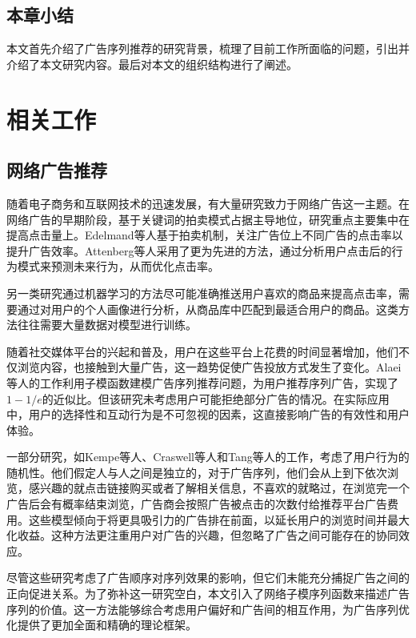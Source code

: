 \section{本章小结}
本文首先介绍了广告序列推荐的研究背景，梳理了目前工作所面临的问题，引出并介绍了本文研究内容。最后对本文的组织结构进行了阐述。


\chapter{相关工作}

\section{网络广告推荐}
\label{sec:2_1}

随着电子商务和互联网技术的迅速发展，有大量研究致力于网络广告这一主题。在网络广告的早期阶段，基于关键词的拍卖模式占据主导地位，研究重点主要集中在提高点击量上。Edelmand等人\cite{edelman2007internet}基于拍卖机制，关注广告位上不同广告的点击率以提升广告效率。Attenberg等人\cite{attenberg2009modeling}采用了更为先进的方法，通过分析用户点击后的行为模式来预测未来行为，从而优化点击率。

另一类研究通过机器学习的方法尽可能准确推送用户喜欢的商品来提高点击率\cite{Cai2021,li2021effective}，需要通过对用户的个人画像进行分析，从商品库中匹配到最适合用户的商品。这类方法往往需要大量数据对模型进行训练。

随着社交媒体平台的兴起和普及，用户在这些平台上花费的时间显著增加，他们不仅浏览内容，也接触到大量广告，这一趋势促使广告投放方式发生了变化。Alaei等人\cite{alaei2021maximizing}的工作利用子模函数建模广告序列推荐问题，为用户推荐序列广告，实现了$1-1/e$的近似比。但该研究未考虑用户可能拒绝部分广告的情况。在实际应用中，用户的选择性和互动行为是不可忽视的因素，这直接影响广告的有效性和用户体验。

一部分研究，如Kempe等人\cite{kempe2008cascade}、Craswell等人\cite{craswell2008experimental}和Tang等人\cite{tang2017robust}的工作，考虑了用户行为的随机性。他们假定人与人之间是独立的，对于广告序列，他们会从上到下依次浏览，感兴趣的就点击链接购买或者了解相关信息，不喜欢的就略过，在浏览完一个广告后会有概率结束浏览，广告商会按照广告被点击的次数付给推荐平台广告费用。这些模型倾向于将更具吸引力的广告排在前面，以延长用户的浏览时间并最大化收益。这种方法更注重用户对广告的兴趣，但忽略了广告之间可能存在的协同效应。

尽管这些研究考虑了广告顺序对序列效果的影响，但它们未能充分捕捉广告之间的正向促进关系。为了弥补这一研究空白，本文引入了网络子模序列函数来描述广告序列的价值。这一方法能够综合考虑用户偏好和广告间的相互作用，为广告序列优化提供了更加全面和精确的理论框架。

